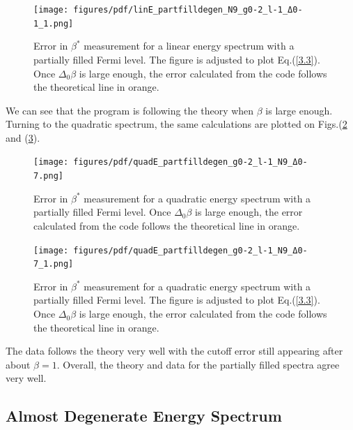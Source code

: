 \begin{figure}[H]
    \centering
    \texttt{[image: figures/pdf/linE\_partfilldegen\_N9\_g0-2\_l-1\_Δ0-1\_1.png]}
    \caption{Error in $\beta^*$ measurement for a linear energy spectrum with a partially filled Fermi level. The figure is adjusted to plot Eq.\@ (\ref{3.3}). Once $\Delta_0\beta$ is large enough, the error calculated from the code follows the theoretical line in orange.}
    \label{fig:PartiallyFilledDegenerateLinearSpectrumAdjustedError}
\end{figure}
We can see that the program is following the theory when $\beta$ is large enough. Turning to the quadratic spectrum, the same calculations are plotted on Figs.\@ (\ref{fig:PartiallyFilledDegenerateQuadraticSpectrumError} and (\ref{fig:PartiallyFilledDegenerateQuadraticSpectrumAdjustedError}). 

\begin{figure}[H]
    \centering
    \texttt{[image: figures/pdf/quadE\_partfilldegen\_g0-2\_l-1\_N9\_Δ0-7.png]}
    \caption{Error in $\beta^*$ measurement for a quadratic energy spectrum with a partially filled Fermi level. Once $\Delta_0\beta$ is large enough, the error calculated from the code follows the theoretical line in orange.}
    \label{fig:PartiallyFilledDegenerateQuadraticSpectrumError}
\end{figure}

\begin{figure}[H]
    \centering
    \texttt{[image: figures/pdf/quadE\_partfilldegen\_g0-2\_l-1\_N9\_Δ0-7\_1.png]}
    \caption{Error in $\beta^*$ measurement for a quadratic energy spectrum with a partially filled Fermi level. The figure is adjusted to plot Eq.\@ (\ref{3.3}). Once $\Delta_0\beta$ is large enough, the error calculated from the code follows the theoretical line in orange.}
    \label{fig:PartiallyFilledDegenerateQuadraticSpectrumAdjustedError}
\end{figure}

The data follows the theory very well with the cutoff error still appearing after about $\beta=1$. Overall, the theory and data for the partially filled spectra agree very well. 
\subsection{Almost Degenerate Energy Spectrum}

